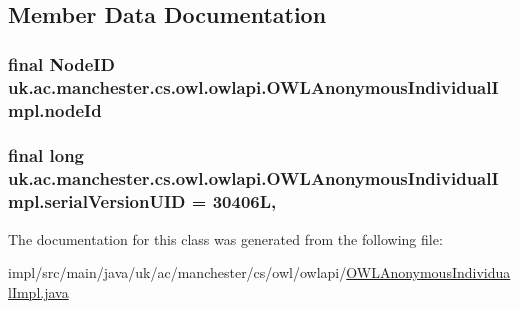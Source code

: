 \subsection{Member Data Documentation}
\hypertarget{classuk_1_1ac_1_1manchester_1_1cs_1_1owl_1_1owlapi_1_1_o_w_l_anonymous_individual_impl_ab874be0f1fee5ffc94b123fc84de6154}{
\subsubsection[{node\-Id}]{\setlength{\rightskip}{0pt plus 5cm}final {\bf Node\-I\-D} uk.\-ac.\-manchester.\-cs.\-owl.\-owlapi.\-O\-W\-L\-Anonymous\-Individual\-Impl.\-node\-Id\hspace{0.3cm}{\ttfamily [private]}}}\label{classuk_1_1ac_1_1manchester_1_1cs_1_1owl_1_1owlapi_1_1_o_w_l_anonymous_individual_impl_ab874be0f1fee5ffc94b123fc84de6154}
\hypertarget{classuk_1_1ac_1_1manchester_1_1cs_1_1owl_1_1owlapi_1_1_o_w_l_anonymous_individual_impl_ab5a49ee41edafe48fd7b1cf7eed4e436}{
\subsubsection[{serial\-Version\-U\-I\-D}]{\setlength{\rightskip}{0pt plus 5cm}final long uk.\-ac.\-manchester.\-cs.\-owl.\-owlapi.\-O\-W\-L\-Anonymous\-Individual\-Impl.\-serial\-Version\-U\-I\-D = 30406\-L\hspace{0.3cm}{\ttfamily [static]}, {\ttfamily [private]}}}\label{classuk_1_1ac_1_1manchester_1_1cs_1_1owl_1_1owlapi_1_1_o_w_l_anonymous_individual_impl_ab5a49ee41edafe48fd7b1cf7eed4e436}


The documentation for this class was generated from the following file\-:\begin{DoxyCompactItemize}
\item 
impl/src/main/java/uk/ac/manchester/cs/owl/owlapi/\hyperlink{_o_w_l_anonymous_individual_impl_8java}{O\-W\-L\-Anonymous\-Individual\-Impl.\-java}\end{DoxyCompactItemize}

